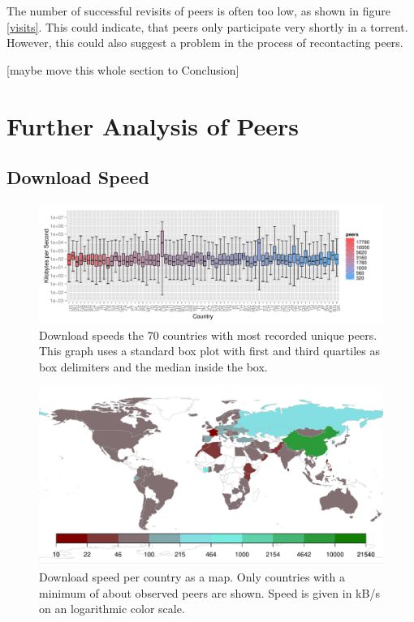 \documentclass[10pt, a4paper, twoside, headsepline]{scrbook}
\renewcommand{\_}{\origunderscore\allowbreak}
\begin{document}
The number of successful revisits of peers is often too low, as shown in figure \ref{visits}. This could indicate, that peers only participate very shortly in a torrent. However, this could also suggest a problem in the process of recontacting peers.

[maybe move this whole section to Conclusion]

\section{Further Analysis of Peers}
\subsection{Download Speed}
\begin{figure}
\centering
\includegraphics[width=\textwidth]{../result/2015-08-30_20-combined_speed_plot}
\caption[Download speed per country as box plot]{Download speeds the 70 countries with most recorded unique peers. This graph uses a standard box plot with first and third quartiles as box delimiters and the median inside the box.}
\label{speed-boxes}
\end{figure}

\begin{figure}
\centering
\includegraphics[width=\textwidth]{../result/2015-08-30_20-combined_speed_map}
\caption[Download speed per country as map]{Download speed per country as a map. Only countries with a minimum of about  observed peers are shown. Speed is given in kB/s on an logarithmic color scale.}
\label{speed-map}
\end{figure}
\end{document}
